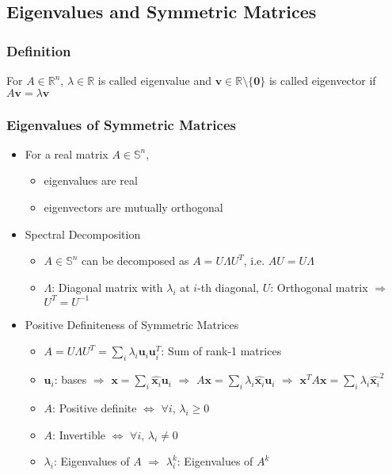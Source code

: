 \subsection{Eigenvalues and Symmetric Matrices}

\subsubsection*{Definition}
For $A \in \mathbb{R}^n$, $\lambda \in \mathbb{R}$ is called eigenvalue and
$\mathbf{v} \in \mathbb{R}\setminus\{\mathbf{0}\}$ is called eigenvector if $ A\mathbf{v} = \lambda\mathbf{v} $

\subsubsection*{Eigenvalues of Symmetric Matrices}
\begin{itemize}
    \item For a real matrix $A \in \mathbb{S}^n$,
    \begin{itemize}
        \item eigenvalues are real
        \item eigenvectors are mutually orthogonal
    \end{itemize}
    \item Spectral Decomposition
    \begin{itemize}
        \item $A \in \mathbb{S}^n$ can be decomposed as $A = U\Lambda U^T$, i.e. $AU = U\Lambda$
        \item $\Lambda$: Diagonal matrix with $\lambda_i$ at $i$-th diagonal,
            $U$: Orthogonal matrix $\Rightarrow$ $U^T = U^{-1}$
    \end{itemize}
    \item Positive Definiteness of Symmetric Matrices
    \begin{itemize}
        \item $A = U\Lambda U^T = \sum_i \lambda_i \mathbf{u}_i \mathbf{u}_i^T$: Sum of rank-1 matrices
        \item $\mathbf{u}_i$: bases $\Rightarrow$ $\mathbf{x} = \sum_{i} \hat{\mathbf{x}_i}\mathbf{u}_i$
            $\Rightarrow$ $A\mathbf{x} = \sum_{i} \lambda_i \hat{\mathbf{x}_i}\mathbf{u}_i$
            $\Rightarrow$ $\mathbf{x}^TA\mathbf{x} = \sum_{i} \lambda_i \hat{\mathbf{x}_i}^2$
        \item $A$: Positive definite $\Leftrightarrow$ $\forall i$, $\lambda_i \geq 0$
        \item $A$: Invertible $\Leftrightarrow$ $\forall i$, $\lambda_i \neq 0$
        \item $\lambda_i$: Eigenvalues of $A$ $\Rightarrow$ $\lambda_i^k$: Eigenvalues of $A^k$
    \end{itemize}
\end{itemize}
